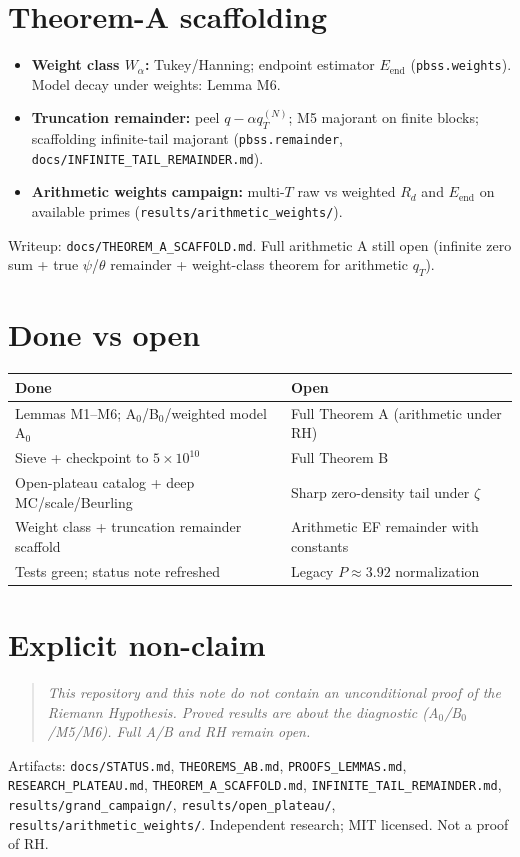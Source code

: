 \documentclass[11pt]{article}
\begin{document}
\section{Theorem-A scaffolding}
\begin{itemize}
\item \textbf{Weight class \(W_\alpha\):} Tukey/Hanning; endpoint estimator \(E_{\mathrm{end}}\)
  (\texttt{pbss.weights}). Model decay under weights: Lemma M6.
\item \textbf{Truncation remainder:} peel \(q-\alpha q_T^{(N)}\); M5 majorant on finite
  blocks; scaffolding infinite-tail majorant
  (\texttt{pbss.remainder}, \texttt{docs/INFINITE\_TAIL\_REMAINDER.md}).
\item \textbf{Arithmetic weights campaign:} multi-\(T\) raw vs weighted \(R_d\) and
  \(E_{\mathrm{end}}\) on available primes (\texttt{results/arithmetic\_weights/}).
\end{itemize}
Writeup: \texttt{docs/THEOREM\_A\_SCAFFOLD.md}. Full arithmetic A still open
(infinite zero sum + true \(\psi\)/\(\theta\) remainder + weight-class theorem for
arithmetic \(q_T\)).

\section{Done vs open}
\begin{center}
\small
\begin{tabular}{@{}p{}p{}@{}}
\toprule
\textbf{Done} & \textbf{Open} \\
\midrule
Lemmas M1--M6; A$_0$/B$_0$/weighted model A$_0$ & Full Theorem A (arithmetic under RH) \\
Sieve + checkpoint to \(5\times 10^{10}\) & Full Theorem B \\
Open-plateau catalog + deep MC/scale/Beurling & Sharp zero-density tail under \(\zeta\) \\
Weight class + truncation remainder scaffold & Arithmetic EF remainder with constants \\
Tests green; status note refreshed & Legacy \(P\approx 3.92\) normalization \\
\bottomrule
\end{tabular}
\end{center}

\section{Explicit non-claim}
\begin{quote}
\itshape
This repository and this note do not contain an unconditional proof of the Riemann Hypothesis.
Proved results are about the diagnostic (A$_0$/B$_0$/M5/M6). Full A/B and RH remain open.
\end{quote}
\noindent
Artifacts: \texttt{docs/STATUS.md}, \texttt{THEOREMS\_AB.md}, \texttt{PROOFS\_LEMMAS.md},
\texttt{RESEARCH\_PLATEAU.md}, \texttt{THEOREM\_A\_SCAFFOLD.md},
\texttt{INFINITE\_TAIL\_REMAINDER.md}, \texttt{results/grand\_campaign/},
\texttt{results/open\_plateau/}, \texttt{results/arithmetic\_weights/}.
Independent research; MIT licensed. Not a proof of RH.
\end{document}
